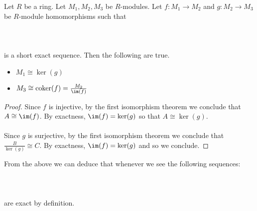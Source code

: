 \documentclass[a4paper]{article}
\begin{document}
\begin{lmm}{}{} Let $R$ be a ring. Let $M_1,M_2,M_3$ be $R$-modules. Let $f:M_1\to M_2$ and $g:M_2\to M_3$ be $R$-module homomorphisms such that \\~\\
\\~\\
is a short exact sequence. Then the following are true. 
\begin{itemize}
\item $M_1\cong\ker(g)$
\item $M_3\cong\text{coker}(f)=\frac{M_2}{\im(f)}$
\end{itemize} \tcbline
\begin{proof}
Since $f$ is injective, by the first isomorphism theorem we conclude that $A\cong\im(f)$. By exactness, $\im(f)=\ker(g)$ so that $A\cong\ker(g)$. \\~\\

Since $g$ is surjective, by the first isomorphism theorem we conclude that $\frac{B}{\ker(g)}\cong C$. By exactness, $\im(f)=\ker(g)$ and so we conclude. 
\end{proof}
\end{lmm}

From the above we can deduce that whenever we see the following sequences: \\~\\
\\~\\
are exact by definition. 
\end{document}
